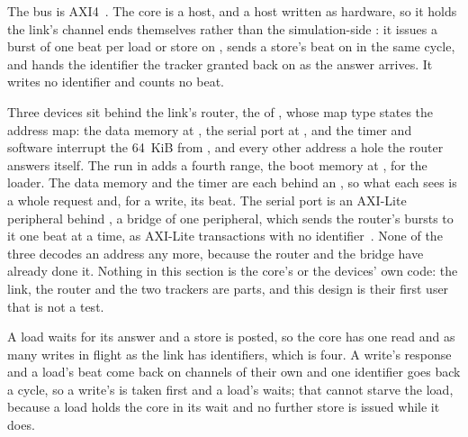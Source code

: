 \documentclass[journal,onecolumn,9pt]{IEEEtran}
\begin{document}
The bus is AXI4~\cite{axi}. The core is a host, and a host written
as hardware, so it holds the link's channel ends themselves rather
than the simulation-side : it issues a burst of one beat
per load or store on , sends a store's beat on
 in the same cycle, and hands the identifier the tracker
granted back on  as the answer arrives. It writes no
identifier and counts no beat.

Three devices sit behind the link's router, the  of
, whose map type states the address map: the data
memory at , the serial port at , and the
timer and software interrupt the 64~KiB from , and
every other address a hole the router answers  itself.
The run in  adds a fourth range, the boot memory at
, for the loader. The data memory and the
timer are each behind an , so what each sees is a whole
request and, for a write, its beat. The serial port is an AXI-Lite
peripheral behind , a bridge of one peripheral,
which sends the router's bursts to it one beat at a time, as
AXI-Lite transactions with no identifier~\cite{axi}. None of the
three decodes an address any more, because the router and the
bridge have already done it. Nothing in this section is the
core's or the devices' own code: the link, the router and the two
trackers are parts, and this design is their first user that is not
a test.

A load waits for its answer and a store is posted, so the core has
one read and as many writes in flight as the link has identifiers,
which is four. A write's response and a load's beat come back on
channels of their own and one identifier goes back a cycle, so a
write's is taken first and a load's waits; that cannot starve the
load, because a load holds the core in its wait and no further store
is issued while it does.
\end{document}
